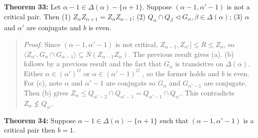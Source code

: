 {\bf Theorem 33:}
Let $\alpha - 1 \in \Delta(\alpha) - \{ \alpha+1 \}$.  Suppose $(\alpha-1, \alpha'-1)$ is not a critical pair.
Then
(1) $ Z_{\alpha} Z_{\alpha+1} = Z_{\alpha} Z_{\alpha-1} $;
(2) $Q_{\alpha} \cap Q_{\beta} \lhd G_{\alpha}, \beta \in \Delta( \alpha)$;
(3) $\alpha$ and
$\alpha'$ are conjugate and $b$ is even.
\begin{quote}
\emph{Proof:}   Since $(\alpha-1, \alpha'-1)$ is not critical, $Z_{\alpha-1}, Z_{\alpha'}] \leq R \leq Z_{\alpha}$,
so $\langle Z_{\alpha'}, G_{\alpha} \cap G_{\alpha-1} \rangle \subseteq N(Z_{\alpha-1}Z_{\alpha})$.  The previous result
gives (a). (b) follows by a previous result and the fact that $G_{\alpha}$ is transisitve on $\Delta( \alpha )$.
Either $\alpha \in (\alpha')^G$ or
$\alpha \in (\alpha'-1)^G$ , so the former holds and $b$ is even.
For (c), note $\alpha$ and $\alpha'-1$ are conjugate so
$G_{\alpha}$ and $G_{\alpha'-1}$ are conjugate.  Then (b) gives $Z_{\alpha} \leq
Q_{\alpha'-2} \cap Q_{\alpha'-1} =
Q_{\alpha'-1} \cap Q_{\alpha'} $.  This contradicts $Z_{\alpha} \nleq Q_{\alpha'}$.
\end{quote}
{\bf Theorem 34:}
Suppose $\alpha - 1 \in \Delta(\alpha) - \{ \alpha+1 \}$ such that  $(\alpha-1, \alpha'-1)$ is a critical pair
then $b=1$.
